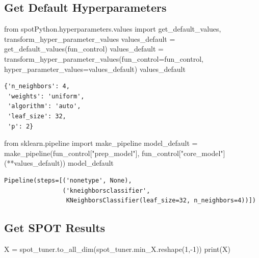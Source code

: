 \documentclass[
  letterpaper,
  DIV=11,
  numbers=noendperiod]{scrreprt}
\newenvironment{Shaded}{\begin{snugshade}}{\end{snugshade}}
\newcommand{\BuiltInTok}[1]{\textcolor[rgb]{0.00,0.23,0.31}{#1}}
\newcommand{\DecValTok}[1]{\textcolor[rgb]{0.68,0.00,0.00}{#1}}
\newcommand{\ImportTok}[1]{\textcolor[rgb]{0.00,0.46,0.62}{#1}}
\newcommand{\NormalTok}[1]{\textcolor[rgb]{0.00,0.23,0.31}{#1}}
\newcommand{\OperatorTok}[1]{\textcolor[rgb]{0.37,0.37,0.37}{#1}}
\newcommand{\StringTok}[1]{\textcolor[rgb]{0.13,0.47,0.30}{#1}}
\begin{document}
\hypertarget{get-default-hyperparameters-4}{%
\subsection{Get Default
Hyperparameters}\label{get-default-hyperparameters-4}}

\begin{Shaded}
\begin{Highlighting}[]
\ImportTok{from}\NormalTok{ spotPython.hyperparameters.values }\ImportTok{import}\NormalTok{ get\_default\_values, transform\_hyper\_parameter\_values}
\NormalTok{values\_default }\OperatorTok{=}\NormalTok{ get\_default\_values(fun\_control)}
\NormalTok{values\_default }\OperatorTok{=}\NormalTok{ transform\_hyper\_parameter\_values(fun\_control}\OperatorTok{=}\NormalTok{fun\_control, hyper\_parameter\_values}\OperatorTok{=}\NormalTok{values\_default)}
\NormalTok{values\_default}
\end{Highlighting}
\end{Shaded}

\begin{verbatim}
{'n_neighbors': 4,
 'weights': 'uniform',
 'algorithm': 'auto',
 'leaf_size': 32,
 'p': 2}
\end{verbatim}

\begin{Shaded}
\begin{Highlighting}[]
\ImportTok{from}\NormalTok{ sklearn.pipeline }\ImportTok{import}\NormalTok{ make\_pipeline}
\NormalTok{model\_default }\OperatorTok{=}\NormalTok{ make\_pipeline(fun\_control[}\StringTok{"prep\_model"}\NormalTok{], fun\_control[}\StringTok{"core\_model"}\NormalTok{](}\OperatorTok{**}\NormalTok{values\_default))}
\NormalTok{model\_default}
\end{Highlighting}
\end{Shaded}

\begin{verbatim}
Pipeline(steps=[('nonetype', None),
                ('kneighborsclassifier',
                 KNeighborsClassifier(leaf_size=32, n_neighbors=4))])
\end{verbatim}

\hypertarget{get-spot-results-4}{%
\subsection{Get SPOT Results}\label{get-spot-results-4}}

\begin{Shaded}
\begin{Highlighting}[]
\NormalTok{X }\OperatorTok{=}\NormalTok{ spot\_tuner.to\_all\_dim(spot\_tuner.min\_X.reshape(}\DecValTok{1}\NormalTok{,}\OperatorTok{{-}}\DecValTok{1}\NormalTok{))}
\BuiltInTok{print}\NormalTok{(X)}
\end{Highlighting}
\end{Shaded}
\end{document}
